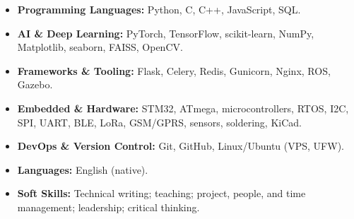 \begin{itemize}
    \item \textbf{Programming Languages:} Python, C, C++, JavaScript, SQL.
    \item \textbf{AI \& Deep Learning:} PyTorch, TensorFlow, scikit-learn, NumPy, Matplotlib, seaborn, FAISS, OpenCV.
    \item \textbf{Frameworks \& Tooling:} Flask, Celery, Redis, Gunicorn, Nginx, ROS, Gazebo.
    \item \textbf{Embedded \& Hardware:} STM32, ATmega, microcontrollers, RTOS, I2C, SPI, UART, BLE, LoRa, GSM/GPRS, sensors, soldering, KiCad.
    \item \textbf{DevOps \& Version Control:} Git, GitHub, Linux/Ubuntu (VPS, UFW).
    \item \textbf{Languages:} English (native).
    \item \textbf{Soft Skills:} Technical writing; teaching; project, people, and time management; leadership; critical thinking.
\end{itemize}
